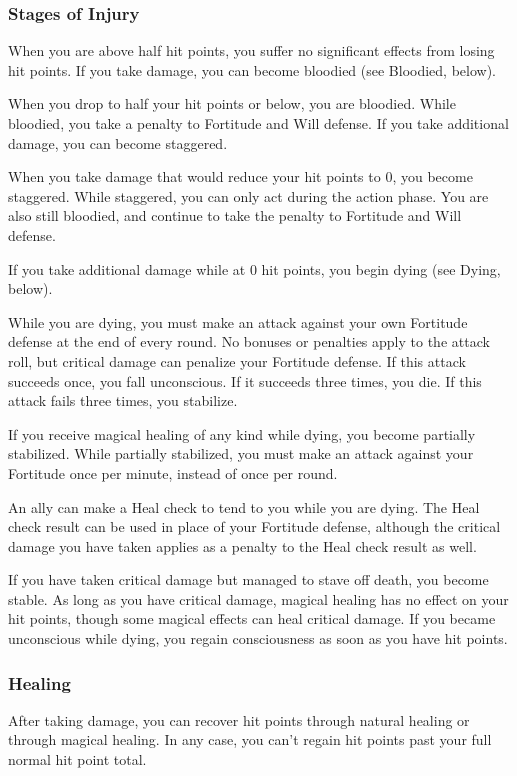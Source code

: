 \subsubsection{Stages of Injury}

 When you are above half hit points, you suffer no significant effects from losing hit points. If you take damage, you can become bloodied (see Bloodied, below).

 When you drop to half your hit points or below, you are bloodied. While bloodied, you take a  penalty to Fortitude and Will defense. If you take additional damage, you can become staggered.

 When you take damage that would reduce your hit points to 0, you become staggered. While staggered, you can only act during the action phase. You are also still bloodied, and continue to take the  penalty to Fortitude and Will defense.

If you take additional damage while at 0 hit points, you begin dying (see Dying, below).

\label{Dying} While you are dying, you must make an attack against your own Fortitude defense at the end of every round. No bonuses or penalties apply to the attack roll, but critical damage can penalize your Fortitude defense. If this attack succeeds once, you fall unconscious. If it succeeds three times, you die. If this attack fails three times, you stabilize.

If you receive magical healing of any kind while dying, you become partially stabilized. While partially stabilized, you must make an attack against your Fortitude once per minute, instead of once per round.

An ally can make a Heal check to tend to you while you are dying. The Heal check result can be used in place of your Fortitude defense, although the critical damage you have taken applies as a penalty to the Heal check result as well.

\label{Stable}
If you have taken critical damage but managed to stave off death, you become stable. As long as you have critical damage, magical healing has no effect on your hit points, though some magical effects can heal critical damage. If you became unconscious while dying, you regain consciousness as soon as you have hit points.

\subsubsection{Healing}
After taking damage, you can recover hit points through natural healing or through magical healing. In any case, you can't regain hit points past your full normal hit point total.

